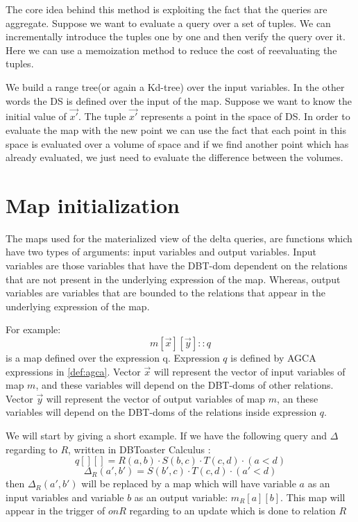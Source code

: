 \documentclass[12pt]{article}
\newcommand{\dom}{\textsf{DBT-dom}}
\begin{document}
The core idea behind this method is exploiting the fact that the queries are aggregate. Suppose we want to evaluate a query over a set of tuples. We can incrementally introduce the tuples one by one and then verify the query over it. Here we can use a memoization method to reduce the cost of reevaluating the tuples. \par

We build a range tree(or again a Kd-tree) over the input variables. In the other words the DS is defined over the input of the map.
Suppose we want to know the initial value of $\vec{x'}$. The tuple $\vec{x'}$ represents a point in the space of DS. In order to evaluate the map with the new point we can use the fact that each point in this space is evaluated over a volume of space and if we find another point which has already evaluated, we just need to evaluate the difference between the volumes.
\section{Map initialization}

The maps used for the materialized view of the delta queries, are functions which have two types of arguments: input variables and output variables. Input variables are those variables that have the \dom{} dependent on the relations that are not present in the underlying expression of the map. Whereas, output variables are variables that are bounded to the relations that appear in the underlying expression of the map.

For example:
$$m[\vec{x}][\vec{y}]::q$$
is a map defined over the expression q. Expression $q$ is defined by AGCA expressions in \ref{def:agca}. Vector $\vec{x}$ will represent the vector of input variables of map $m$, and these variables will depend on the \dom{}s of other relations. Vector $\vec{y}$ will represent the vector of output variables of map $m$, an these variables will depend on the \dom{}s of the relations inside expression $q$.

We will start by giving a short example. If we have the following query and $\Delta$ regarding to $R$, written in DBToaster Calculus \cite{1}:
$$q[][]=R(a,b)\cdot S(b,c)\cdot T(c,d)\cdot (a<d)$$
$$\Delta_R(a',b') = S(b',c)\cdot T(c,d)\cdot (a'<d)$$
then $\Delta_R(a',b')$ will be replaced by a map which will have variable $a$ as an input variables and variable $b$ as an output variable: $m_R[a][b]$. This map will appear in the trigger of $onR$ regarding to an update which is done to relation $R$
\end{document}
